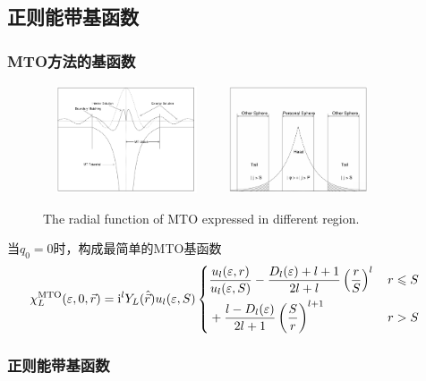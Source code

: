{\subsection{正则能带基函数}
\frame
{
	\frametitle{\textrm{MTO}方法的基函数}
\begin{figure}[h!]
	\vspace{-13pt}
\centering
\includegraphics[height=1.25in,width=1.95in,viewport=0 0 845 635,clip]{Figures/MTO-envelope-1.png}
\includegraphics[height=1.25in,width=1.95in,viewport=0 0 885 635,clip]{Figures/MTO-envelope-2.png}
\caption{\tiny \textrm{The radial function of MTO expressed in different region.}}%
\label{MTO-envelope}
\end{figure}
当$q_0=0$时，构成最简单的\textrm{MTO}基函数
		\begin{displaymath}
			\hspace*{-12pt}\chi_L^{\mathrm{MTO}}(\varepsilon,0,\vec r)=\mathrm{i}^lY_L(\hat{\vec r})u_l(\varepsilon,S)\left\{
			\begin{aligned}
				&\dfrac{u_l(\varepsilon,r)}{u_l(\varepsilon,S)}-\dfrac{D_l(\varepsilon)+l+1}{2l+l}\left(\dfrac rS\right)^l&\, r\leqslant S\\
				&+\dfrac{l-D_l(\varepsilon)}{2l+1}\left(\dfrac Sr\right)^{l+1}&\, r>S
			\end{aligned}\right.
		\end{displaymath}
}

\frame
{
	\frametitle{正则能带基函数}

}}
